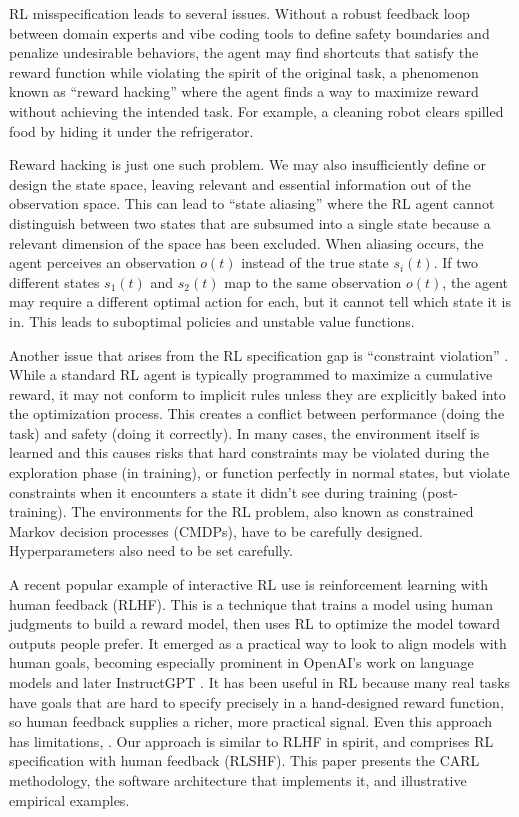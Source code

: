 \documentclass[mnsc,sglanonrev]{informs4}
\begin{document}
RL misspecification leads to several issues. Without a robust feedback loop between domain experts and vibe coding tools to define safety boundaries and penalize undesirable behaviors, the agent may find shortcuts that satisfy the reward function while violating the spirit of the original task, a phenomenon known as ``reward hacking'' \citep{amodei_concrete_2016} where the agent finds a way to maximize reward without achieving the intended task. For example, a cleaning robot clears spilled food by hiding it under the refrigerator. 

Reward hacking is just one such problem. We may also insufficiently define or design the state space, leaving relevant and essential information out of the observation space. This can lead to ``state aliasing'' \citep{asri_study_2019} where the RL agent cannot distinguish between two states that are subsumed into a single state because a relevant dimension of the space has been excluded. When aliasing occurs, the agent perceives an observation $o(t)$ instead of the true state $s_i(t)$. If two different states $s_1(t)$ and $s_2(t)$ map to the same observation $o(t)$, the agent may require a different optimal action for each, but it cannot tell which state it is in. This leads to suboptimal policies and unstable value functions. 

Another issue that arises from the RL specification gap is ``constraint violation'' \citep{bai_achieving_2022, ghosh_towards_2024}. While a standard RL agent is typically programmed to maximize a cumulative reward, it may not conform to implicit rules unless they are explicitly baked into the optimization process. This creates a conflict between performance (doing the task) and safety (doing it correctly). In many cases, the environment itself is learned and this causes risks that hard constraints may be violated during the exploration phase (in training), or function perfectly in normal states, but violate constraints when it encounters a state it didn't see during training (post-training). The environments for the RL problem, also known as constrained Markov decision processes (CMDPs), have to be carefully designed. Hyperparameters also need to be set carefully. 

A recent popular example of interactive RL use is reinforcement learning with human feedback (RLHF). This is a technique that trains a model using human judgments to build a reward model, then uses RL to optimize the model toward outputs people prefer. It emerged as a practical way to look to align models with human goals, becoming especially prominent in OpenAI’s work on language models and later InstructGPT \citep{ouyang_training_2022, stiennon_learning_2022}.  It has been useful in RL because many real tasks have goals that are hard to specify precisely in a hand-designed reward function, so human feedback supplies a richer, more practical signal. Even this approach has limitations, \cite{casper_open_2023}. 
Our approach is similar to RLHF in spirit, and comprises RL specification with human feedback (RLSHF). This paper presents the CARL methodology, the software architecture that implements it, and illustrative empirical examples.
\end{document}

